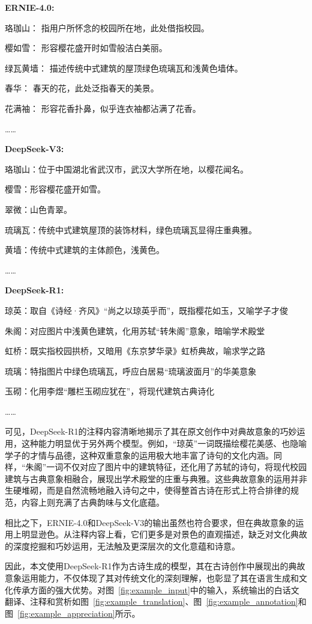 {\kaishu
\textbf{ERNIE-4.0:} \par 
珞珈山： 指用户所怀念的校园所在地，此处借指校园。\par 
樱如雪： 形容樱花盛开时如雪般洁白美丽。\par 
绿瓦黄墙： 描述传统中式建筑的屋顶绿色琉璃瓦和浅黄色墙体。\par 
春华： 春天的花，此处泛指春天的美景。\par 
花满袖： 形容花香扑鼻，似乎连衣袖都沾满了花香。\par 
…… \par
\textbf{DeepSeek-V3:} \par
珞珈山：位于中国湖北省武汉市，武汉大学所在地，以樱花闻名。\par
樱雪：形容樱花盛开如雪。\par
翠微：山色青翠。\par
琉璃瓦：传统中式建筑屋顶的装饰材料，绿色琉璃瓦显得庄重典雅。\par
黄墙：传统中式建筑的主体颜色，浅黄色。\par
……\par

\textbf{DeepSeek-R1:} \par
琼英：取自《诗经·齐风》“尚之以琼英乎而”，既指樱花如玉，又喻学子才俊\par
朱阁：对应图片中浅黄色建筑，化用苏轼“转朱阁”意象，暗喻学术殿堂\par
虹桥：既实指校园拱桥，又暗用《东京梦华录》虹桥典故，喻求学之路\par
琉璃：特指图片中绿色琉璃瓦，呼应白居易“琉璃波面月”的华美意象\par
玉砌：化用李煜“雕栏玉砌应犹在”，将现代建筑古典诗化\par……
}

可见，DeepSeek-R1的注释内容清晰地揭示了其在原文创作中对典故意象的巧妙运用，这种能力明显优于另外两个模型。例如，“琼英”一词既描绘樱花美感、也隐喻学子的才情与品德，这种双重意象的运用极大地丰富了诗句的文化内涵。同样，“朱阁”一词不仅对应了图片中的建筑特征，还化用了苏轼的诗句，将现代校园建筑与古典意象相融合，展现出学术殿堂的庄重与典雅。这些典故意象的运用并非生硬堆砌，而是自然流畅地融入诗句之中，使得整首古诗在形式上符合排律的规范，内容上则充满了古典韵味与文化底蕴。

相比之下，ERNIE-4.0和DeepSeek-V3的输出虽然也符合要求，但在典故意象的运用上明显逊色。从注释内容上看，它们更多是对景色的直观描述，缺乏对文化典故的深度挖掘和巧妙运用，无法触及更深层次的文化意蕴和诗意。

因此，本文使用DeepSeek-R1作为古诗生成的模型，其在古诗创作中展现出的典故意象运用能力，不仅体现了其对传统文化的深刻理解，也彰显了其在语言生成和文化传承方面的强大优势。对图~\ref{fig:example_input}中的输入，系统输出的白话文翻译、注释和赏析如图~\ref{fig:example_translation}、图~\ref{fig:example_annotation}和图~\ref{fig:example_appreciation}所示。

